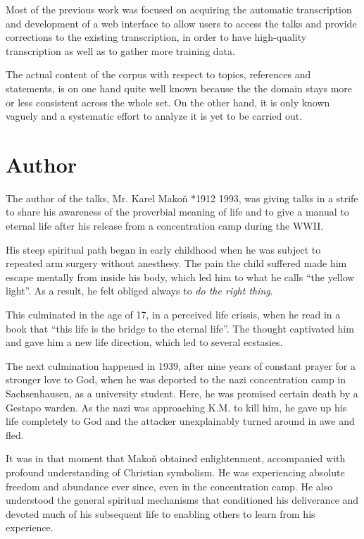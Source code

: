 \documentclass[a4paper,11pt]{article}
\begin{document}
Most of the previous work was focused on acquiring the automatic transcription
and development of a web interface to allow users to access the talks and
provide corrections to the existing transcription, in order to have high-quality
transcription as well as to gather more training data.

The actual content of the corpus with respect to topics, references and
statements, is on one hand quite well known
because the the domain stays
more or less consistent across the whole set. On the other hand, it is only
known vaguely and a systematic effort to analyze it is yet to be carried out.

\section{Author}

The author of the talks, Mr. Karel Mako\v{n} *1912 \textdagger{}1993, was giving
talks in a strife to share his awareness of the proverbial meaning of life and
to give a manual to eternal life after his release from a concentration camp
during the WWII.

His steep spiritual path began in early childhood when he was
subject to repeated arm surgery without anesthesy. The pain the child suffered
made him escape mentally from inside his body, which led him to what he calls
``the yellow light''. As a result, he felt obliged always to {\em do the right
thing}.

This culminated in the age of 17, in a perceived life crissis, when he read in a
book that ``this life is the bridge to the eternal life''. The thought
captivated him and gave him a new life direction, which led to several
ecstasies.

The next culmination happened in 1939, after nine years of constant prayer for a
stronger love to God, when he was deported to the nazi concentration camp in
Sachsenhausen, as a university student. Here, he was promised certain death by a
Gestapo warden. As the nazi was approaching K.M. to kill him, he gave up his
life completely to God and the attacker unexplainably turned around in awe and
fled.

It was in that moment that Mako\v{n} obtained enlightenment, accompanied with
profound understanding of Christian symbolism. He was experiencing absolute
freedom and abundance ever since, even in the concentration camp. He also
understood the general spiritual mechanisms that conditioned his deliverance and
devoted much of his subsequent life to enabling others to learn from his
experience.
\end{document}
